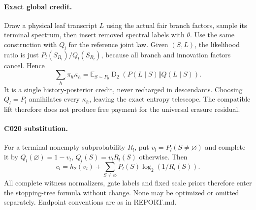 \documentclass[11pt]{article}
\newcommand{\KL}{\operatorname{D}_2}
\begin{document}
\paragraph{Exact global credit.}
Draw a physical leaf transcript $L$ using the actual fair branch factors,
sample its terminal spectrum, then insert removed spectral labels with
$\theta$. Use the same construction with $Q_l$ for the reference joint law.
Given $(S,L)$, the likelihood ratio is just $P_l(S_{R_l})/Q_l(S_{R_l})$,
because all branch and innovation factors cancel. Hence
\[
\sum_h\pi_h\kappa_h=
\mathbb E_{S\sim P_0}\KL(P(L\mid S)\Vert Q(L\mid S)).
\]
It is a single history-posterior credit, never recharged in descendants.
Choosing $Q_l=P_l$ annihilates every $\kappa_h$, leaving the exact entropy
telescope. The compatible lift therefore does not produce free payment
for the universal erasure residual.

\paragraph{C020 substitution.}
For a terminal nonempty subprobability $R_l$, put
$v_l=P_l(S\ne\varnothing)$ and complete it by
$Q_l(\varnothing)=1-v_l$, $Q_l(S)=v_lR_l(S)$ otherwise. Then
\[
c_l=h_2(v_l)+\sum_{S\ne\varnothing}P_l(S)\log_2(1/R_l(S)).
\]
All complete witness normalizers, gate labels and fixed scale priors
therefore enter the stopping-tree formula without change. None may be
optimized or omitted separately. Endpoint conventions are as in REPORT.md.
\end{document}
